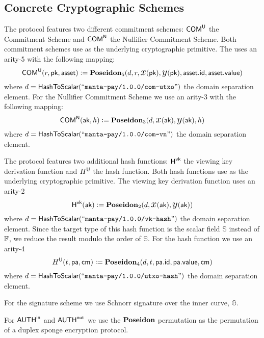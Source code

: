 \subsection{Concrete Cryptographic Schemes}

\begin{definition}
    The protocol features two different commitment schemes: ${\textsf{COM}}^{{\textsf{U}}}$ the \UTXO{} Commitment Scheme and ${\textsf{COM}}^{{\textsf{N}}}$ the Nullifier Commitment Scheme. Both commitment schemes use \Poseidon{} as the underlying cryptographic primitive. The \UTXO{} uses an arity-5 \Poseidon{} with the following mapping:
    \[{\textsf{COM}}^{{\textsf{U}}}(r, {\textsf{pk}}, {\textsf{asset}}) := {\textbf{Poseidon}}_5(d, r, {\text{\Large $x$}}({\textsf{pk}}), {\text{\Large $y$}}({\textsf{pk}}), {\textsf{asset}}.{\textsf{id}}, {\textsf{asset}}.{\textsf{value}})\]
    where $d = {\textsf{HashToScalar}}({``\texttt{manta-pay/1.0.0/com-utxo}"})$ the domain separation element.
    For the Nullifier Commitment Scheme we use an arity-3 \Poseidon{} with the following mapping:
    \[{\textsf{COM}}^{{\textsf{N}}}({\textsf{ak}}, h) := {\textbf{Poseidon}}_3(d, {\text{\Large $x$}}({\textsf{ak}}), {\text{\Large $y$}}({\textsf{ak}}), h)\]
    where $d = {\textsf{HashToScalar}}({``\texttt{manta-pay/1.0.0/com-vn}"})$ the domain separation element.
\end{definition}

\begin{definition}
    The protocol features two additional hash functions: ${\textsf{H}}^{{\textsf{vk}}}$ the viewing key derivation function and $H^{{\textsf{U}}}$ the \UTXO{} hash function. Both hash functions use \Poseidon{} as the underlying cryptographic primitive. The viewing key derivation function uses an arity-2 \Poseidon{}
    \[{\textsf{H}}^{{\textsf{vk}}}({\textsf{ak}}) := {\textbf{Poseidon}}_2(d, {\text{\Large $x$}}({\textsf{ak}}), {\text{\Large $y$}}({\textsf{ak}}))\]
    where $d = {\textsf{HashToScalar}}({``\texttt{manta-pay/1.0.0/vk-hash}"})$ the domain separation element. Since the target type of this hash function is the scalar field $\mathbb{S}$ instead of ${\mathbb{F}}$, we reduce the result modulo the order of $\mathbb{S}$.
    For the \UTXO{} hash function we use an arity-4 \Poseidon{}
    \[H^{{\textsf{U}}}(t, {\textsf{pa}}, {\textsf{cm}}) := {\textbf{Poseidon}}_4(d, t, {\textsf{pa}}.{\textsf{id}}, {\textsf{pa}}.{\textsf{value}}, {\textsf{cm}})\]
    where $d = {\textsf{HashToScalar}}({``\texttt{manta-pay/1.0.0/utxo-hash}"})$ the domain separation element.
\end{definition}

\begin{definition}
    For the signature scheme we use Schnorr signature over the inner curve, $\mathbb{G}$.
\end{definition}

\begin{definition}
    For ${{\textsf{AUTH}}^\textsf{in}}$ and ${{\textsf{AUTH}}^\textsf{out}}$ we use the ${\textbf{Poseidon}}$ permutation as the permutation of a duplex sponge \cite{duplexsponge} encryption protocol.
\end{definition}

